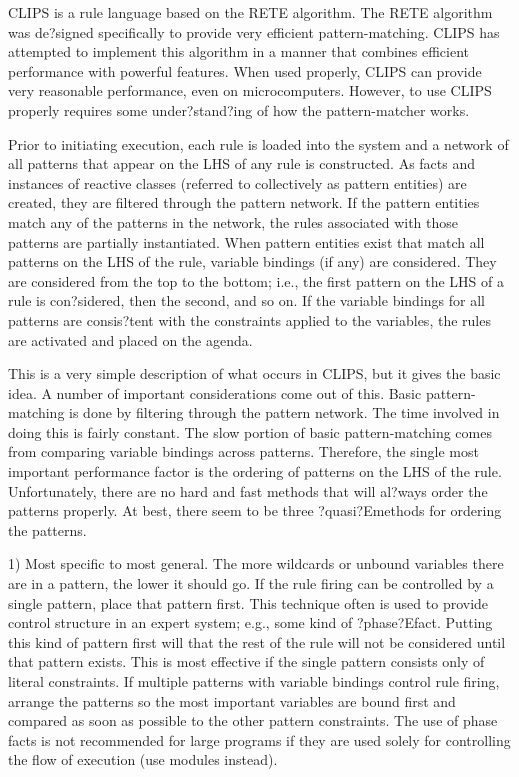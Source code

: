 \documentclass[letterpaper,10pt,english]{sphinxmanual}
\begin{document}
CLIPS is a rule language based on the RETE algorithm. The RETE algorithm
was de?signed specifically to provide very efficient pattern-matching.
CLIPS has attempted to implement this algorithm in a manner that
combines efficient performance with powerful features. When used
properly, CLIPS can provide very reasonable performance, even on
microcomputers. However, to use CLIPS properly requires some
under?stand?ing of how the pattern-matcher works.

Prior to initiating execution, each rule is loaded into the system and a
network of all patterns that appear on the LHS of any rule is
constructed. As facts and instances of reactive classes (referred to
collectively as pattern entities) are created, they are filtered through
the pattern network. If the pattern entities match any of the patterns
in the network, the rules associated with those patterns are partially
instantiated. When pattern entities exist that match all patterns on the
LHS of the rule, variable bindings (if any) are considered. They are
considered from the top to the bottom; i.e., the first pattern on the
LHS of a rule is con?sidered, then the second, and so on. If the
variable bindings for all patterns are consis?tent with the constraints
applied to the variables, the rules are activated and placed on the
agenda.

This is a very simple description of what occurs in CLIPS, but it gives
the basic idea. A number of important considerations come out of this.
Basic pattern-matching is done by filtering through the pattern network.
The time involved in doing this is fairly constant. The slow portion of
basic pattern-matching comes from comparing variable bindings across
patterns. Therefore, the single most important performance factor is the
ordering of patterns on the LHS of the rule. Unfortunately, there are no
hard and fast methods that will al?ways order the patterns properly. At
best, there seem to be three ?quasi?Emethods for ordering the patterns.

1) Most specific to most general. The more wildcards or unbound
variables there are in a pattern, the lower it should go. If the rule
firing can be controlled by a single pattern, place that pattern first.
This technique often is used to provide control structure in an expert
system; e.g., some kind of ?phase?Efact. Putting this kind of pattern
first will  that the rest of the rule will not be considered
until that pattern exists. This is most effective if the single pattern
consists only of literal constraints. If multiple patterns with variable
bindings control rule firing, arrange the patterns so the most important
variables are bound first and compared as soon as possible to the other
pattern constraints. The use of phase facts is not recommended for large
programs if they are used solely for controlling the flow of execution
(use modules instead).
\end{document}
